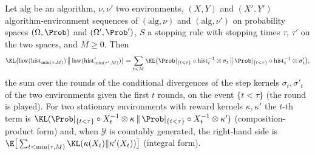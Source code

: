 \begin{lemma}\label{lem:stopped_history_chain_rule}
\leanok
{}
Let $\mathrm{alg}$ be an algorithm, $\nu,\nu'$ two environments, $(X,Y)$ and $(X',Y')$
algorithm-environment sequences of $(\mathrm{alg},\nu)$ and $(\mathrm{alg},\nu')$ on probability
spaces $(\Omega,\Prob)$ and $(\Omega',\Prob')$, $S$ a stopping rule with stopping times $\tau$,
$\tau'$ on the two spaces, and $M \ge 0$. Then
\[
  \KL\big(\mathrm{law}(\mathrm{hist}_{\min(\tau,M)})\,\big\|\,\mathrm{law}(\mathrm{hist}'_{\min(\tau',M)})\big)
  = \sum_{t < M} \KL\big(\Prob|_{\{t<\tau\}}\circ\mathrm{hist}_t^{-1}\otimes\sigma_t\,\big\|\,
      \Prob|_{\{t<\tau\}}\circ\mathrm{hist}_t^{-1}\otimes\sigma'_t\big),
\]
the sum over the rounds of the conditional divergences of the step kernels $\sigma_t,\sigma'_t$
of the two environments given the first $t$ rounds, on the event $\{t < \tau\}$ (the round is
played). For two stationary environments with reward kernels $\kappa,\kappa'$ the $t$-th term is
$\KL(\Prob|_{\{t<\tau\}}\circ X_t^{-1}\otimes\kappa\,\|\,\Prob|_{\{t<\tau\}}\circ X_t^{-1}\otimes\kappa')$
(composition-product form) and, when $\mathcal{Y}$ is countably generated, the right-hand side is
$\E\big[\sum_{t<\min(\tau,M)}\KL(\kappa(X_t)\|\kappa'(X_t))\big]$ (integral form).
\end{lemma}

